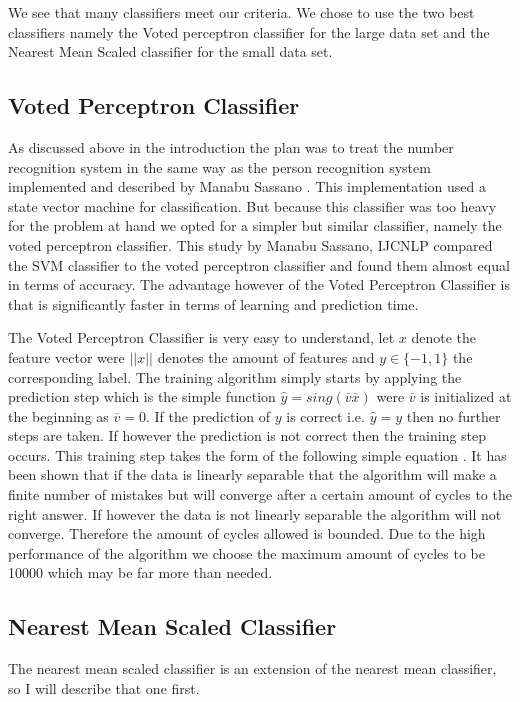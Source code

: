 \documentclass[%
        compressed,
        final,
        notitlepage,
        narroweqnarray,
        inline,
        twoside,
        ]{ieee}
\begin{document}
We see that many classifiers meet our criteria. We chose to use the two best
classifiers namely the Voted perceptron classifier for the large data set and
the Nearest Mean Scaled classifier for the small data set.

\subsection{Voted Perceptron Classifier}
As discussed above in the introduction the plan was to treat the number
recognition system in the same way as the person recognition system implemented
and described by Manabu Sassano \cite{Manabu}.
This implementation used a state vector machine for classification. But because
this classifier was too heavy for the problem at hand we opted for a simpler but
similar classifier, namely the voted perceptron classifier. This study by Manabu
Sassano, IJCNLP compared the SVM classifier to the voted perceptron classifier
and found them almost equal in terms of accuracy. The advantage however of the
Voted Perceptron Classifier is that is significantly faster in terms of learning
and prediction time.

The Voted Perceptron Classifier is very easy to understand, let $x$ denote the
feature vector were $||x||$ denotes the amount of features and $y \in \{-1,1\}$
the corresponding label. The training algorithm simply starts by applying the
prediction step which is the simple function $\hat{y} =
sing(\overline{v}\overline{x})$ were $\overline{v}$ is
initialized at the beginning as $\overline{v}=0$. If the prediction of $y$ is correct i.e.
$\hat{y}=y$
then no further steps are taken. If however the prediction is not correct then
the training step occurs. This training step takes the form of the following
simple equation . It has been shown that if the data is linearly separable that
the algorithm will make a finite number of mistakes but will converge after a
certain amount of cycles to the right answer. If however the data is not
linearly separable the algorithm will not converge. Therefore the amount of
cycles allowed is bounded. Due to the high performance of the algorithm we
choose the maximum amount of cycles to be 10000 which may be far more than
needed.

\subsection{Nearest Mean Scaled Classifier}
The nearest mean scaled classifier is an extension of the nearest mean
classifier, so I will describe that one first.
\end{document}
